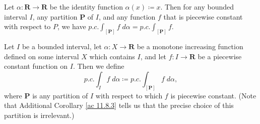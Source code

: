 \setcounter{theorem}{6}
\begin{example}\label{11.8.7}
    Let \(\alpha : \mathbf{R} \to \mathbf{R}\) be the identity function \(\alpha(x) \coloneqq x\).
    Then for any bounded interval \(I\), any partition \(\mathbf{P}\) of \(I\), and any function \(f\) that is piecewise constant with respect to \(P\), we have \(p.c. \int_{[\mathbf{P}]} f \; d \alpha = p.c. \int_{[\mathbf{P}]} f\).
\end{example}

\begin{definition}\label{11.8.9}
    Let \(I\) be a bounded interval, let \(\alpha : X \to \mathbf{R}\) be a monotone increasing function defined on some interval \(X\) which contains \(I\), and let \(f : I \to \mathbf{R}\) be a piecewise constant function on \(I\).
    Then we define
    \[
        p.c. \int_I f \; d \alpha \coloneqq p.c. \int_{[\mathbf{P}]} f \; d \alpha,
    \]
    where \(\mathbf{P}\) is any partition of \(I\) with respect to which \(f\) is piecewise constant.
    (Note that Additional Corollary \ref{ac 11.8.3} tells us that the precise choice of this partition is irrelevant.)
\end{definition}

